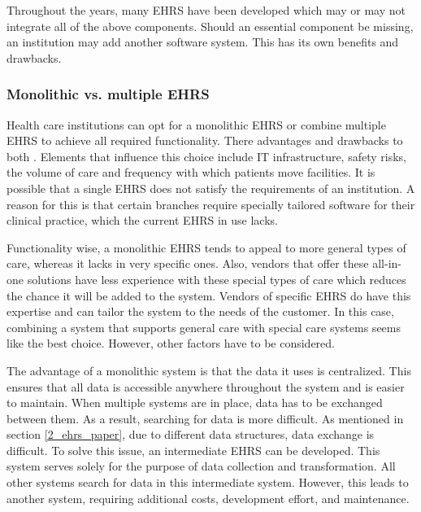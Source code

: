         \noindent Throughout the years, many EHRS have been developed which may or may not integrate all of the above components. Should an essential component be missing, an institution may add another software system. This has its own benefits and drawbacks.

        \subsubsection{Monolithic vs. multiple EHRS} \label{ehrs_comparison}

        Health care institutions can opt for a monolithic EHRS or combine multiple EHRS to achieve all required functionality. There advantages and drawbacks to both \cite{multiple_ehrs}. Elements that influence this choice include IT infrastructure, safety risks, the volume of care and frequency with which patients move facilities. It is possible that a single EHRS does not satisfy the requirements of an institution. A reason for this is that certain branches require specially tailored software for their clinical practice, which the current EHRS in use lacks.

        Functionality wise, a monolithic EHRS tends to appeal to more general types of care, whereas it lacks in very specific ones. Also, vendors that offer these all-in-one solutions have less experience with these special types of care which reduces the chance it will be added to the system. Vendors of specific EHRS do have this expertise and can tailor the system to the needs of the customer. In this case, combining a system that supports general care with special care systems seems like the best choice. However, other factors have to be considered.

        The advantage of a monolithic system is that the data it uses is centralized. This ensures that all data is accessible anywhere throughout the system and is easier to maintain. When multiple systems are in place, data has to be exchanged between them. As a result, searching for data is more difficult. As mentioned in section \ref{2_ehrs_paper}, due to different data structures, data exchange is difficult. To solve this issue, an intermediate EHRS can be developed. This system serves solely for the purpose of data collection and transformation. All other systems search for data in this intermediate system. However, this leads to another system, requiring additional costs, development effort, and maintenance.
    
